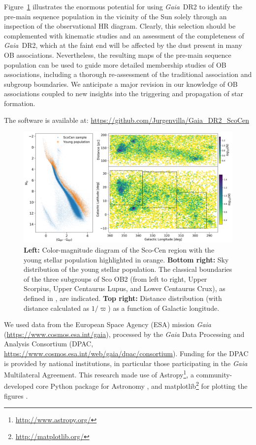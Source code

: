 \documentclass[RNAAS]{aastex62}
\newcommand\gaia{\textit{Gaia}}
\newcommand\gdr[1]{\gaia~DR#1}
\begin{document}
Figure~\ref{fig:cmd} illustrates the enormous potential for using \gdr{2} to identify the pre-main sequence population in the vicinity of the Sun solely through an inspection of the observational HR diagram. Clearly, this selection should be complemented with kinematic studies and an assessment of the completeness of \gdr{2}, which at the faint end will be affected by the dust present in many OB associations. Nevertheless, the resulting maps of the pre-main sequence population can be used to guide more detailed membership studies of OB associations, including a thorough re-assessment of the traditional association and subgroup boundaries. We anticipate a major revision in our knowledge of OB associations coupled to new insights into the triggering and propagation of star formation.

The software is available at: \url{https://github.com/Jurgenvilla/Gaia_DR2_ScoCen}

\begin{figure}[h!]
\begin{center}
\includegraphics[scale=0.48,angle=0]{ScoCen_Coordinates.png}
\caption{\textbf{Left:} Color-magnitude diagram of the Sco-Cen region with the young stellar population highlighted in orange. \textbf{Bottom right:} Sky distribution of the young stellar population. The classical boundaries of the three subgroups of Sco OB2 (from left to right, Upper Scorpius, Upper Centaurus Lupus, and Lower Centaurus Crux), as defined in \cite{deZeeuw99}, are indicated. \textbf{Top right:} Distance distribution (with distance calculated as $1/\varpi$) as a function of Galactic longitude.\label{fig:cmd}}
\end{center}
\end{figure}

\acknowledgments

We used data from the European Space Agency (ESA) mission {\gaia} (\url{https://www.cosmos.esa.int/gaia}), processed by the {\gaia} Data Processing and Analysis Consortium (DPAC, \url{https://www.cosmos.esa.int/web/gaia/dpac/consortium}). Funding for the DPAC is provided by national institutions, in particular those participating in the {\gaia} Multilateral Agreement. This research made use of Astropy\footnote{\url{http://www.astropy.org/}}, a community-developed core Python package for Astronomy \citep{Robitaille13}, and matplotlib\footnote{\url{http://matplotlib.org/}} for plotting the figures \citep{Hunter07}.


\end{document}
